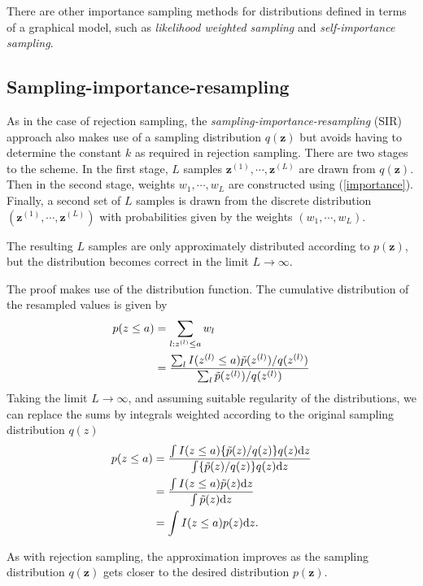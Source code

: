 \documentclass[a4paper]{report}
\newcommand{\ud}{\mathrm{d}}
\renewcommand{\bf}{\mathbf}
\newcommand{\imp}[1]{{\color{blue}\textit{#1}}}
\begin{document}
There are other importance sampling methods for distributions defined in terms of a graphical model, such as \imp{likelihood weighted sampling} and \imp{self-importance sampling}.
\subsection{Sampling-importance-resampling}
As in the case of rejection sampling, the \imp{sampling-importance-resampling} (SIR) approach also makes use of a sampling distribution $q(\bf{z})$ but avoids having to determine the constant $k$ as required in rejection sampling. There are two stages to the scheme. In the first stage, $L$ samples $\bf{z}^{(1)},\cdots,\bf{z}^{(L)}$ are drawn from $q(\bf{z})$. Then in the second stage, weights $w_1,\cdots,w_L$ are constructed using (\ref{importance}). Finally, a second set of $L$ samples is drawn from the discrete distribution $(\bf{z}^{(1)},\cdots,\bf{z}^{(L)})$ with probabilities given by the weights $(w_1,\cdots,w_L)$.

The resulting $L$ samples are only approximately distributed according to $p(\bf{z})$, but the distribution becomes correct in the limit $L \rightarrow \infty$.

The proof makes use of the distribution function. The cumulative distribution of the resampled values is given by
\begin{align}
	p(z \leq a) &= \sum_{l:z^{(l)}\leq a} w_l \notag \\
	&= \frac{\sum_l I(z^{(l)}\leq a)\tilde{p}(z^{(l)})/q(z^{(l)})}{\sum_l \tilde{p}(z^{(l)})/q(z^{(l)})}
\end{align}
Taking the limit $L \rightarrow \infty$, and assuming suitable regularity of the distributions, we can replace the sums by integrals weighted according to the original sampling distribution $q(z)$
\begin{align}
	p(z \leq a) &= \frac{\int I(z \leq a)\{ \tilde{p}(z)/q(z) \}q(z) \ud z}{\int \{ \tilde{p}(z)/q(z) \} q(z)\ud z} \notag \\
	&= \frac{\int I(z \leq a)\tilde{p}(z)\ud z}{\int \tilde{p}(z)\ud z} \notag \\
	&= \int I(z \leq a)p(z) \ud z.
\end{align}

As with rejection sampling, the approximation improves as the sampling distribution $q(\bf{z})$ gets closer to the desired distribution $p(\bf{z})$.
\end{document}
